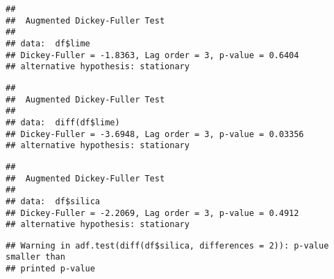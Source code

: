 \documentclass[
]{article}
\newenvironment{Shaded}{\begin{snugshade}}{\end{snugshade}}
\newcommand{\AttributeTok}[1]{\textcolor[rgb]{0.13,0.29,0.53}{#1}}
\newcommand{\CommentTok}[1]{\textcolor[rgb]{0.56,0.35,0.01}{\textit{#1}}}
\newcommand{\DecValTok}[1]{\textcolor[rgb]{0.00,0.00,0.81}{#1}}
\newcommand{\FunctionTok}[1]{\textcolor[rgb]{0.13,0.29,0.53}{\textbf{#1}}}
\newcommand{\NormalTok}[1]{#1}
\newcommand{\SpecialCharTok}[1]{\textcolor[rgb]{0.81,0.36,0.00}{\textbf{#1}}}
\begin{document}
\begin{verbatim}
## 
##  Augmented Dickey-Fuller Test
## 
## data:  df$lime
## Dickey-Fuller = -1.8363, Lag order = 3, p-value = 0.6404
## alternative hypothesis: stationary
\end{verbatim}

\begin{Shaded}
\end{Shaded}

\begin{verbatim}
## 
##  Augmented Dickey-Fuller Test
## 
## data:  diff(df$lime)
## Dickey-Fuller = -3.6948, Lag order = 3, p-value = 0.03356
## alternative hypothesis: stationary
\end{verbatim}

\begin{Shaded}
\end{Shaded}

\begin{verbatim}
## 
##  Augmented Dickey-Fuller Test
## 
## data:  df$silica
## Dickey-Fuller = -2.2069, Lag order = 3, p-value = 0.4912
## alternative hypothesis: stationary
\end{verbatim}

\begin{Shaded}
\end{Shaded}

\begin{verbatim}
## Warning in adf.test(diff(df$silica, differences = 2)): p-value smaller than
## printed p-value
\end{verbatim}
\end{document}
